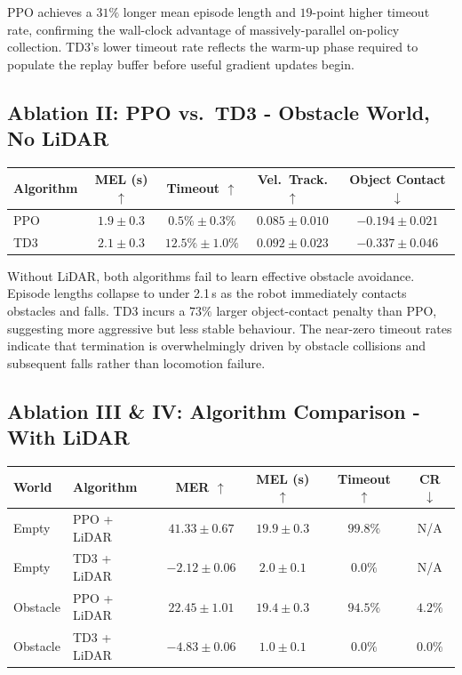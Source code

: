 \documentclass{article}
\begin{document}
PPO achieves a $31\%$ longer mean episode length and $19$-point higher timeout
rate, confirming the wall-clock advantage of massively-parallel on-policy
collection. TD3's lower timeout rate reflects the warm-up phase required to
populate the replay buffer before useful gradient updates begin.

\subsection{Ablation II: PPO vs.\ TD3 - Obstacle World, No LiDAR}

\begin{center}
\begin{tabular}{lcccc}
  \toprule
  \textbf{Algorithm} & \textbf{MEL (s)} $\uparrow$ & \textbf{Timeout} $\uparrow$
    & \textbf{Vel.\ Track.} $\uparrow$ & \textbf{Object Contact} $\downarrow$ \\
  \midrule
  PPO & $1.9 \pm 0.3$ & $0.5\% \pm 0.3\%$ & $0.085 \pm 0.010$ & $-0.194 \pm 0.021$ \\
  TD3 & $2.1 \pm 0.3$ & $12.5\% \pm 1.0\%$ & $0.092 \pm 0.023$ & $-0.337 \pm 0.046$ \\
  \bottomrule
\end{tabular}
\end{center}

Without LiDAR, both algorithms fail to learn effective obstacle avoidance.
Episode lengths collapse to under 2.1\,s as the robot immediately contacts
obstacles and falls. TD3 incurs a $73\%$ larger object-contact penalty than
PPO, suggesting more aggressive but less stable behaviour. The near-zero
timeout rates indicate that termination is overwhelmingly driven by obstacle
collisions and subsequent falls rather than locomotion failure.

\subsection{Ablation III \& IV: Algorithm Comparison - With LiDAR}

\begin{center}
\begin{tabular}{llcccc}
  \toprule
  \textbf{World} & \textbf{Algorithm} & \textbf{MER} $\uparrow$
    & \textbf{MEL (s)} $\uparrow$ & \textbf{Timeout} $\uparrow$ & \textbf{CR} $\downarrow$ \\
  \midrule
  Empty    & PPO + LiDAR & $41.33 \pm 0.67$ & $19.9 \pm 0.3$ & $99.8\%$ & N/A \\
  Empty    & TD3 + LiDAR & $-2.12 \pm 0.06$ & $2.0 \pm 0.1$  & $0.0\%$  & N/A \\
  Obstacle & PPO + LiDAR & $22.45 \pm 1.01$ & $19.4 \pm 0.3$ & $94.5\%$ & $4.2\%$ \\
  Obstacle & TD3 + LiDAR & $-4.83 \pm 0.06$ & $1.0 \pm 0.1$  & $0.0\%$  & $0.0\%$ \\
  \bottomrule
\end{tabular}
\end{center}
\end{document}
